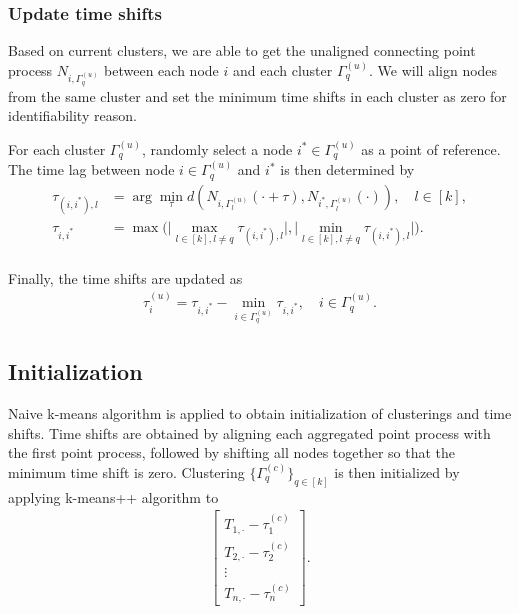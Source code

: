 \subsubsection*{Update time shifts}
Based on current clusters, we are able to get the unaligned connecting point process $N_{i,\Gamma_q^{(u)}}$ between each node $i$ and each cluster $\Gamma_q^{(u)}$.
We will align nodes from the same cluster and set the minimum time shifts in each cluster as zero for identifiability reason.

For each cluster $\Gamma_q^{(u)}$, randomly select a node $i^*\in\Gamma_q^{(u)}$ as a point of reference. 
The time lag between node $i\in\Gamma_q^{(u)}$ and $i^*$ is then determined by 
\begin{align}
\tau_{(i,i^*),l} &=  \arg\min_{\tau} d(N_{i,\Gamma_l^{(u)}}(\cdot+\tau), N_{i^*,\Gamma_l^{(u)}}(\cdot)) , \quad l\in[k],
\\
\tau_{i,i^*} &= \max \Big( \big|\max_{l\in[k], l\neq q} \tau_{(i,i^*),l}\big|, \big|\min_{l\in[k], l\neq q} \tau_{(i,i^*),l}\big| \Big).
\label{eq: align i and i^*}
\end{align}
\\
Finally, the time shifts are updated as
\begin{align}
\tau_{i}^{(u)} = \tau_{i,i^*} - \min_{i\in\Gamma_q^{(u)}} \tau_{i,i^*}, \quad i\in\Gamma_q^{(u)}.
\label{eq: update time shifts}
\end{align}











\subsection{Initialization}

Naive k-means algorithm is applied to obtain initialization of clusterings and time shifts.
Time shifts are obtained by aligning each aggregated point process with the first point process, followed by shifting all nodes together so that the minimum time shift is zero.
Clustering 
$\{  \Gamma_q^{(c)} \}_{q\in[k]}$ is then initialized by applying k-means++ algorithm to 
\begin{align*}
\begin{bmatrix}
T_{1,\cdot}-\tau_1^{(c)}\\
T_{2,\cdot}-\tau_2^{(c)}\\
\vdots\\
T_{n,\cdot}-\tau_n^{(c)}
\end{bmatrix}.
\end{align*}




